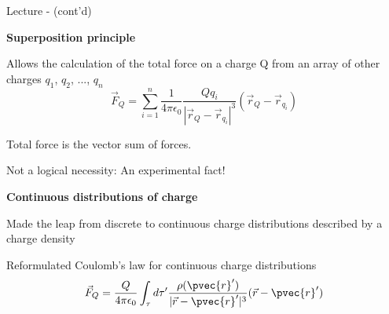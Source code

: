 \begin{frame}{Lecture \summarizedlecture - \lecturesummarytitle (cont'd)}

\begin{itemize}
{\small

\item {\bf Superposition principle}
  \begin{itemize}
  {\small
     \item Allows the calculation of the total force on a charge Q
           from an array of other charges $q_1$, $q_2$, ..., $q_n$
      \begin{equation*}
       \vec{F}_{Q} = \sum_{i=1}^{n} \frac{1}{4\pi\epsilon_0}
          \frac{Q q_i}{|\vec{r}_{Q}-\vec{r}_{q_{i}}|^{3}} (\vec{r}_{Q}-\vec{r}_{q_{i}})
       \end{equation*}
     \item Total force is the vector sum of forces.
     \item Not a logical necessity: An experimental fact!
  }
  \end{itemize}

\vspace{0.2cm}

\item {\bf Continuous distributions of charge}
  \begin{itemize}
  {\small
    \item Made the leap from discrete to continuous charge distributions described by a charge density
    \item Reformulated Coulomb's law for continuous charge distributions
     \begin{equation*}
        \vec{F}_{Q} = \frac{Q}{4\pi\epsilon_0} \int_{\tau}
           d\tau^{\prime} \frac{\rho({\pvec{r}'})}{|\vec{r}-\pvec{r}'|^{3}} (\vec{r}-\pvec{r}')
     \end{equation*}
  }
  \end{itemize}

}
\end{itemize}

\end{frame}

%
%
%

